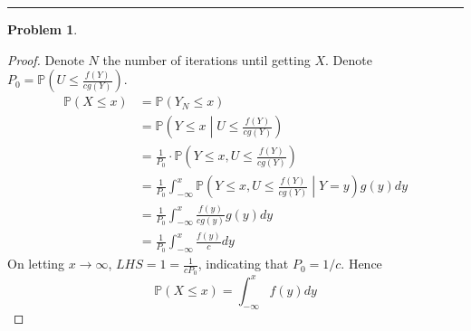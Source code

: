 \documentclass[a4paper, 10pt]{article}
\theoremstyle{definition}
\newtheorem{problem}{Problem}
\theoremstyle{hSol}
\begin{document}
\noindent\rule{16cm}{0.4pt}
\begin{problem} 
\end{problem}
\begin{proof} Denote $N$ the number of iterations until getting $X$. Denote $P_0 = \mathbb{P}\left(U\leq \frac{f(Y)}{cg(Y)}\right)$.
\begin{equation}
  \begin{split}
    \mathbb{P}\left(X\leq x\right) &= \mathbb{P}\left(Y_N \leq x\right) \\
    &= \mathbb{P}\left(Y\leq x\middle|U\leq \frac{f(Y)}{cg(Y)}\right) \\
    &= \frac{1}{P_0} \cdot \mathbb{P}\left(Y\leq x, U\leq \frac{f(Y)}{cg(Y)}\right) \\
    &= \frac{1}{P_0} \int_{-\infty}^x \mathbb{P}\left(Y\leq x, U\leq \frac{f(Y)}{cg(Y)}\middle |Y=y\right)g(y)dy \\
    &= \frac{1}{P_0} \int_{-\infty}^x\frac{f(y)}{cg(y)}g(y)dy \\
    &= \frac{1}{P_0} \int_{-\infty}^x\frac{f(y)}{c}dy
  \end{split}
\end{equation}
On letting $x\to \infty$, $LHS=1=\frac{1}{cP_0}$, indicating that $P_0 = 1/c$. Hence
\begin{equation}
  \mathbb{P}\left(X\leq x\right) = \int_{-\infty}^x f(y)dy
\end{equation}
\end{proof}
\end{document}
